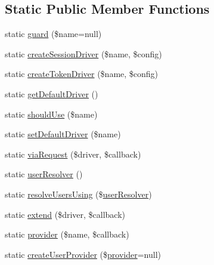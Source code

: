 \subsection*{Static Public Member Functions}
\begin{DoxyCompactItemize}
\item 
static \mbox{\hyperlink{class_illuminate_1_1_support_1_1_facades_1_1_auth_a432fde79e22091b6140b1fdbc725a72d}{guard}} (\$name=null)
\item 
static \mbox{\hyperlink{class_illuminate_1_1_support_1_1_facades_1_1_auth_a62a5d99a2d3d429c0f268824ca653803}{create\+Session\+Driver}} (\$name, \$config)
\item 
static \mbox{\hyperlink{class_illuminate_1_1_support_1_1_facades_1_1_auth_aafc443ec8004cdce83d728e6f04f8994}{create\+Token\+Driver}} (\$name, \$config)
\item 
static \mbox{\hyperlink{class_illuminate_1_1_support_1_1_facades_1_1_auth_a28c2308e161fd8146ed3d2e8481827d0}{get\+Default\+Driver}} ()
\item 
static \mbox{\hyperlink{class_illuminate_1_1_support_1_1_facades_1_1_auth_acc225c4397c62a6f93d9bd87bba44562}{should\+Use}} (\$name)
\item 
static \mbox{\hyperlink{class_illuminate_1_1_support_1_1_facades_1_1_auth_ae76bb55b5f629f397cc1e4e6c1c7b214}{set\+Default\+Driver}} (\$name)
\item 
static \mbox{\hyperlink{class_illuminate_1_1_support_1_1_facades_1_1_auth_a6c74f6505618b87ab69949b662fba9b9}{via\+Request}} (\$driver, \$callback)
\item 
static \mbox{\hyperlink{class_illuminate_1_1_support_1_1_facades_1_1_auth_ab6601a8ada37b3aaaab8700de51eb523}{user\+Resolver}} ()
\item 
static \mbox{\hyperlink{class_illuminate_1_1_support_1_1_facades_1_1_auth_af5d4285e6f94d28c07f9ab9f7077df5a}{resolve\+Users\+Using}} (\$\mbox{\hyperlink{class_illuminate_1_1_support_1_1_facades_1_1_auth_ab6601a8ada37b3aaaab8700de51eb523}{user\+Resolver}})
\item 
static \mbox{\hyperlink{class_illuminate_1_1_support_1_1_facades_1_1_auth_ad6fdb08c1e3db9081087ec888f3c0193}{extend}} (\$driver, \$callback)
\item 
static \mbox{\hyperlink{class_illuminate_1_1_support_1_1_facades_1_1_auth_abf132c9b8d5ccce533211625ec83dc35}{provider}} (\$name, \$callback)
\item 
static \mbox{\hyperlink{class_illuminate_1_1_support_1_1_facades_1_1_auth_afdd867755aae03ffd16c73de0daff938}{create\+User\+Provider}} (\$\mbox{\hyperlink{class_illuminate_1_1_support_1_1_facades_1_1_auth_abf132c9b8d5ccce533211625ec83dc35}{provider}}=null)

\end{DoxyCompactItemize}

